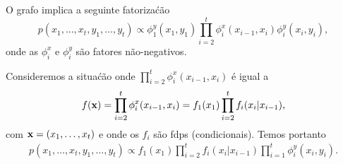 \begin{center}
\end{center}

O grafo implica a seguinte fatoriza\'c\~ao
\begin{equation}
    p( x_1, \ldots, x_t,y_1, \ldots, y_t) \propto \phi_1^y(x_1, y_1) \prod_{i=2}^t \phi_i^x(x_{i-1}, x_i) \phi_i^y(x_i, y_i),
\end{equation}
onde as $\phi_i^x$ e $\phi_i^y$ s\~ao fatores n\~ao-negativos.

Consideremos a situa\'c\~ao onde $\prod_{i=2}^t \phi^x_i(x_{i-1}, x_i)$ \'e igual a
\begin{equation}
    f(\mathbf{x}) = \prod_{i=2}^t \phi^x_i(x_{i-1}, x_i) = f_1(x_1) \prod_{i=2}^t f_i(x_i|x_{i-1}),
\end{equation}
com $\mathbf{x}=(x_1, \ldots, x_t)$ e onde os $f_i$ s\~ao fdps (condicionais). Temos portanto
\begin{align}
    p(x_1, \ldots, x_t, y_1, \ldots, y_t) \propto f_1(x_1) \prod_{i=2}^t f_i(x_i|x_{i-1}) \prod_{i=1}^t \phi_i^y(x_i, y_i).
    \label{eq:Markov-model-joint-def-corrected}
\end{align}

